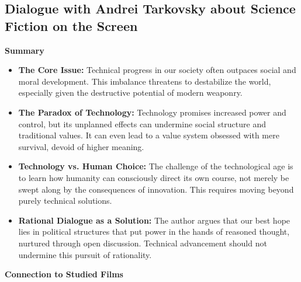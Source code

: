 \documentclass[11pt,fleqn]{book} %
\begin{document}
\subsection{Dialogue with Andrei Tarkovsky about Science Fiction on the Screen}
\textbf{Summary}

\begin{itemize}
\item \textbf{The Core Issue:} Technical progress in our society often outpaces social and moral development. This imbalance threatens to destabilize the world, especially given the destructive potential of modern weaponry.

\item \textbf{The Paradox of Technology:} Technology promises increased power and control, but its unplanned effects can undermine social structure and traditional values. It can even lead to a value system obsessed with mere survival, devoid of higher meaning.

\item \textbf{Technology vs. Human Choice:} The challenge of the technological age is to learn how humanity can consciously direct its own course, not merely be swept along by the consequences of innovation. This requires moving beyond purely technical solutions. 

\item \textbf{Rational Dialogue as a Solution:}  The author argues that our best hope lies in political structures that put power in the hands of reasoned thought, nurtured through open discussion. Technical advancement should not undermine this pursuit of rationality.
\end{itemize}
\vspace{5pt}

\textbf{Connection to Studied Films}
\end{document}

